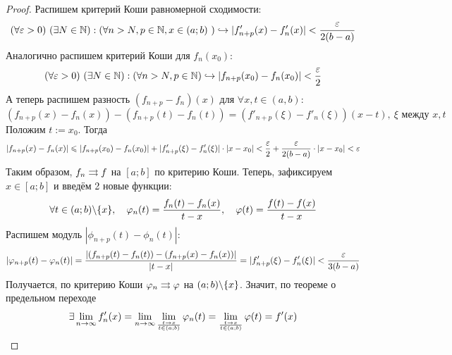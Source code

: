 \begin{proof}
	Распишем критерий Коши равномерной сходимости:
	\[
		(\forall \varepsilon > 0)\ (\exists N \in \mathbb{N}) : (\forall n > N, p \in \mathbb{N}, x \in (a; b)\ ) \hookrightarrow |f'_{n + p}(x) - f'_n(x)| < \frac{\varepsilon}{2(b - a)}
	\]
	Аналогично распишем критерий Коши для $f_n(x_0)$:
	\[
		(\forall \varepsilon > 0)\ (\exists N \in \mathbb{N}) : (\forall n > N, p \in \mathbb{N}) \hookrightarrow |f_{n + p}(x_0) - f_n(x_0)| < \frac{\varepsilon}{2}
	\]
	А теперь распишем разность $(f_{n + p} - f_n)(x)$ для $\forall x, t \in (a, b)$:
	\[
		(f_{n + p}(x) - f_n(x)) - (f_{n + p}(t ) - f_n(t)) = (f'_{n + p}(\xi) - f'_n(\xi))(x - t),\ \xi \text{ между } x, t
	\]
	Положим $t := x_0$. Тогда
	\[
		|f_{n + p}(x) - f_n(x)| \leqslant |f_{n + p}(x_0) - f_n(x_0)| + |f'_{n + p}(\xi) - f'_n(\xi)| \cdot |x - x_0| < \frac{\varepsilon}{2} + \frac{\varepsilon}{2(b - a)} \cdot |x - x_0| < \varepsilon
	\]
	Таким образом, $f_n \rightrightarrows f$ на $[a; b]$ по критерию Коши. Теперь, зафиксируем $x \in [a; b]$ и введём 2 новые функции:
	\[
		\forall t \in (a; b) \backslash \{x\}, \quad \varphi_n(t) = \frac{f_n(t) - f_n(x)}{t - x}, \quad \varphi(t) = \frac{f(t) - f(x)}{t - x}
	\]
	Распишем модуль $|\phi_{n + p}(t) - \phi_n(t)|$:
	\[
		|\varphi_{n + p}(t) - \varphi_n(t)| = \frac{|(f_{n + p}(t) - f_n(t)) - (f_{n + p}(x) - f_n(x))|}{|t - x|} = |f'_{n + p}(\xi) - f'_n(\xi)| < \frac{\varepsilon}{3(b - a)}
	\]
	Получается, по критерию Коши $\varphi_n \rightrightarrows \varphi$ на $(a; b) \backslash \{x\}$. Значит, по теореме о предельном переходе
	\[
		\exists\lim\limits_{n\to\infty} f'_n(x) = \lim\limits_{n \to \infty} \lim\limits_{t \to x \over t \in (a; b)} \varphi_n(t) = \lim\limits_{t \to x \over t \in (a; b)} \varphi(t) = f'(x)
	\]
\end{proof}